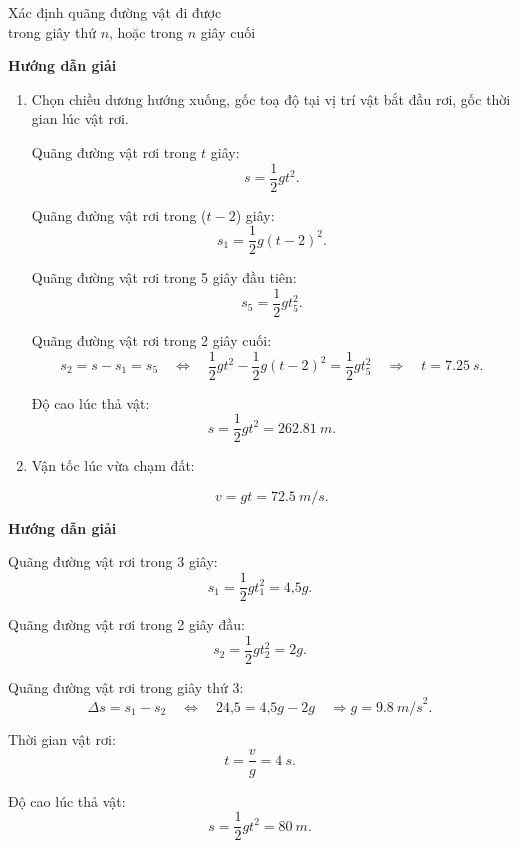 \begin{dang}{Xác định quãng đường vật đi được \\trong giây thứ $n$, hoặc trong $n$ giây cuối}
	{	\begin{center}
			\textbf{Hướng dẫn giải}
		\end{center}
		\begin{enumerate}[label=\alph*.]
			\item Chọn chiều dương hướng xuống, gốc toạ độ tại vị trí vật bắt đầu rơi, gốc thời gian lúc vật rơi. 
			
			Quãng đường vật rơi trong $t$ giây: 
			$$s = \dfrac{1}{2}gt^2.$$
			
			Quãng đường vật rơi trong ($t - 2$) giây: 
			$$s_1 =\dfrac{1}{2}g(t-2)^2.$$
			
			Quãng đường vật rơi trong 5 giây đầu tiên: 
			$$s_5 = \dfrac{1}{2}gt_5^2.$$
			
			Quãng đường vật rơi trong 2 giây cuối: 
			$$s_2 = s - s_1 = s_5 \quad\Leftrightarrow\quad  \dfrac{1}{2}gt^2 - \dfrac{1}{2}g(t-2)^2 = \dfrac{1}{2}gt_5^2 \quad\Rightarrow\quad t = \SI{7,25}{s}.$$
			
			Độ cao lúc thả vật:
			$$s = \dfrac{1}{2}gt^2= \SI{262,81}{m}.$$
			\item  Vận tốc lúc vừa chạm đất:
			
			$$v = gt = \SI{72,5}{m/s}.$$
		\end{enumerate}
	}
	{	\begin{center}
			\textbf{Hướng dẫn giải}
		\end{center}
		
		Quãng đường vật rơi trong 3 giây: 
			$$s_1 = \dfrac{1}{2}gt^2_1 =\text{4,5}g.$$	
		
		Quãng đường vật rơi trong 2 giây đầu: 
			$$s_2 = \dfrac{1}{2}gt^2_2 =2g.$$	
		
		Quãng đường vật rơi trong giây thứ 3: 
			$$\Delta s = s_1 - s_2 \quad\Leftrightarrow\quad \text{24,5} = \text{4,5}g - 2g \quad\Rightarrow g = \SI{9,8}{m/s}^2.$$
		
		Thời gian vật rơi:
			$$t =\dfrac{v}{g} = \SI{4}{s}.$$
		
		Độ cao lúc thả vật: 
			$$s =\dfrac{1}{2}gt^2 =\SI{80}{m}.$$
		
	}
\end{dang}
